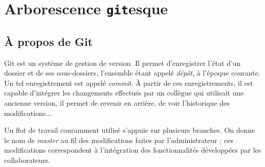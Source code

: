 \newenvironment{git}{
  \bigskip
  \noindent%
  \begin{tikzpicture}[scale=0.9]%
}{%
  \end{tikzpicture}
  \bigskip
}

\gdef\ccommit[#1](#2,#3)#4{
  (#2, #3) coordinate (#4)
  circle[fill, radius=0.1]
  node[outer sep=1pt, #1]{#4}
}
\gdef\commit(#1,#2)#3{
  (#1, #2) coordinate (#3)
  circle[fill, radius=0.1]
  node[outer sep=1pt, above]{#3}
}

\newcommand{\bmaster}{
  \commit(0, 0){A} node[outer sep=3pt, below]{v0.0} --
  \commit(1, 0){B} node[outer sep=3pt, below]{v0.1} --
  \commit(5, 0){F} --
  \commit(6, 0){I} node[outer sep=3pt, below]{v1.0}
                   node[outer sep=3pt, right]{\emph{master}}
}

\newcommand{\balpha}{
  (B) --
  \commit(2, -1){C} --
  \commit(3, -1){D} --
  \commit(4, -1){E} node[outer sep=3pt, right]{\emph{alpha}} --
  (F)
}

\newcommand{\bbeta}{
  (B) --
  \commit(2.5, -2){G} --
  \commit(4, -2){H} node[outer sep=3pt, right]{\emph{beta}} --
  (I)
}

\newcommand{\bbetaPrime}{
  (D) --
  \commit(4, -2){G'} --
  \commit(5, -2){H'} node[outer sep=3pt, right]{\emph{beta}} --
  (I)
}

\chapter{Arborescence \texttt{git}esque}
\label{app:git}

\section{À propos de Git}

Git est un système de gestion de version. Il permet d'enregistrer
l'état d'un dossier et de ses sous-dossiers, l'ensemble étant appelé
\emph{dépôt}, à l'époque courante. Un tel enregistrement est appelé
\emph{commit}. À partir de ces enregistrements, il est capable
d'intégrer les changements effectués par un collègue qui utilisait une
ancienne version, il permet de revenir en arrière, de voir
l'historique des modifications...

Un flot de travail couramment utilisé s'appuie sur plusieurs
branches. On donne le nom de \emph{master} au fil des modifications
faites par l'administrateur ; ces modifications correspondent à
l'intégration des fonctionnalités développées par les collaborateurs.

